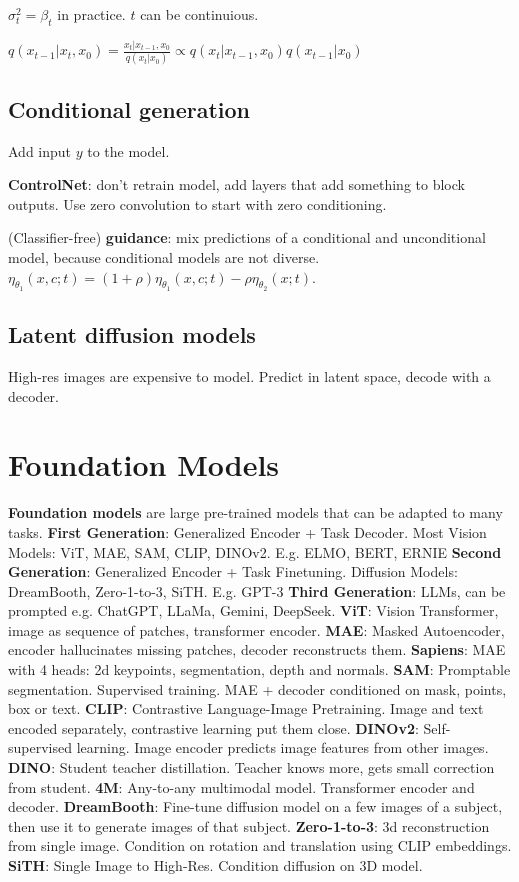 \documentclass[11pt,landscape,a4paper,fleqn]{article}
\begin{document}
\begin{multicols*}{4}
$\sigma_t^2 = \beta_t$ in practice.
$t$ can be continuious.

$q(x_{t-1} | x_t, x_0) = \frac{x_t | x_{t-1}, x_0}{q(x_t | x_0)} \propto q(x_t | x_{t-1}, x_0)q(x_{t-1} | x_0)$


\subsection{Conditional generation}

Add input $y$ to the model.

\textbf{ControlNet}: don't retrain model, add layers that add something to block outputs. 
Use zero convolution to start with zero conditioning.

(Classifier-free) \textbf{guidance}: mix predictions of a conditional and unconditional model,
because conditional models are not diverse.
$\eta_{\theta_1}(x, c; t) = (1 + \rho)\eta_{\theta_1}(x, c; t) - \rho \eta_{\theta_2}(x; t)$.

\subsection{Latent diffusion models}

High-res images are expensive to model.
Predict in latent space, decode with a decoder.

\section{Foundation Models}
\textbf{Foundation models} are large pre-trained models that can be adapted to many tasks.
\textbf{First Generation}: Generalized Encoder + Task Decoder. Most Vision Models: ViT, MAE, SAM, CLIP, DINOv2. E.g. ELMO, BERT, ERNIE
\textbf{Second Generation}: Generalized Encoder + Task Finetuning. Diffusion Models: DreamBooth, Zero-1-to-3, SiTH. E.g. GPT-3
\textbf{Third Generation}: LLMs, can be prompted e.g. ChatGPT, LLaMa, Gemini, DeepSeek.
\textbf{ViT}: Vision Transformer, image as sequence of patches, transformer encoder.
\textbf{MAE}: Masked Autoencoder, encoder hallucinates missing patches, decoder reconstructs them.
\textbf{Sapiens}: MAE with 4 heads: 2d keypoints, segmentation, depth and normals.
\textbf{SAM}: Promptable segmentation. Supervised training. MAE + decoder conditioned on mask, points, box or text.
\textbf{CLIP}: Contrastive Language-Image Pretraining. Image and text encoded separately, contrastive learning put them close.
\textbf{DINOv2}: Self-supervised learning. Image encoder predicts image features from other images.
\textbf{DINO}: Student teacher distillation. Teacher knows more, gets small correction from student.
\textbf{4M}: Any-to-any multimodal model. Transformer encoder and decoder.
\textbf{DreamBooth}: Fine-tune diffusion model on a few images of a subject, then use it to generate images of that subject.
\textbf{Zero-1-to-3}: 3d reconstruction from single image. Condition on rotation and translation using CLIP embeddings.
\textbf{SiTH}: Single Image to High-Res. Condition diffusion on 3D model.


\end{multicols*}
\end{document}
